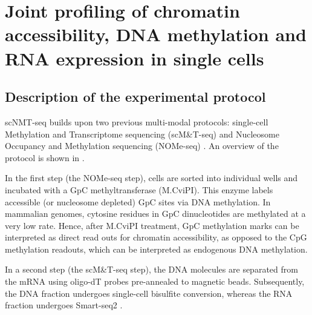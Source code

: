 \graphicspath{{Chapter1/Figs/}}

\section{Joint profiling of chromatin accessibility, DNA methylation and RNA expression in single cells}

\subsection{Description of the experimental protocol} \label{section:scnmt_protocol}

scNMT-seq builds upon two previous multi-modal protocols: single-cell Methylation and Transcriptome sequencing (scM\&T-seq) \cite{Angermueller2016} and Nucleosome Occupancy and Methylation sequencing (NOMe-seq) \cite{Kelly2012,Pott2016}. An overview of the protocol is shown in .

In the first step (the NOMe-seq step), cells are sorted into individual wells and incubated with a GpC methyltransferase (M.CviPI). This enzyme labels accessible (or nucleosome depleted) GpC sites via DNA methylation\cite{Kilgore2007, Kelly2012}. In mammalian genomes, cytosine residues in GpC dinucleotides are methylated at a very low rate. Hence, after M.CviPI treatment, GpC methylation marks can be interpreted as direct read outs for chromatin accessibility, as opposed to the CpG methylation readouts, which can be interpreted as endogenous DNA methylation\cite{Kilgore2007, Kelly2012}.

In a second step (the scM\&T-seq step), the DNA molecules are separated from the mRNA using oligo-dT probes pre-annealed to magnetic beads. Subsequently, the DNA fraction undergoes single-cell bisulfite conversion\cite{Smallwood2014}, whereas the RNA fraction undergoes Smart-seq2 \cite{Picelli2014}.\\

